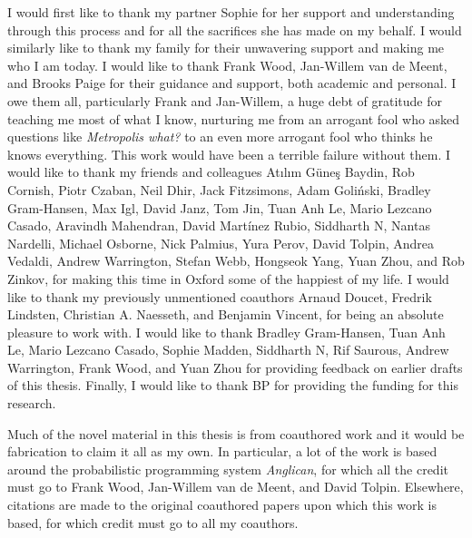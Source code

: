 
\vspace{20pt}
I would first like to thank my partner Sophie for her support and understanding through this
process and for all the sacrifices she has made on my behalf.  I would similarly like to
thank my family for their unwavering support and making me who I am today.  I would like
to thank Frank Wood, Jan-Willem van de Meent, and Brooks Paige for their guidance and
support, both academic and personal.  I owe them all, particularly Frank and Jan-Willem,
a huge debt of gratitude for teaching me most of what I know, nurturing me from an
arrogant fool who asked questions like \emph{Metropolis what?} to an even more arrogant
fool who thinks he knows everything.  This work would have been a terrible failure without them.
I would like to thank my friends and colleagues 
Atılım Güneş Baydin, Rob Cornish, Piotr Czaban, Neil Dhir, Jack Fitzsimons, Adam Goliński,
Bradley Gram-Hansen, Max Igl, David Janz, Tom Jin, Tuan Anh Le, Mario Lezcano Casado, 
Aravindh Mahendran, David Martínez Rubio, Siddharth N, Nantas Nardelli, Michael Osborne,
Nick Palmius, Yura Perov, David Tolpin, Andrea Vedaldi, Andrew Warrington, Stefan Webb, 
Hongseok Yang, Yuan Zhou, and Rob Zinkov, for making this time in Oxford some of the 
happiest of my life.  I would like to thank my previously unmentioned coauthors Arnaud Doucet, Fredrik Lindsten,
Christian A. Naesseth, and Benjamin Vincent, for being an absolute pleasure to work with.
I would like to thank Bradley Gram-Hansen, Tuan Anh Le, Mario Lezcano Casado, Sophie Madden, Siddharth N, Rif Saurous,
Andrew Warrington, Frank Wood, and Yuan Zhou for providing feedback on earlier drafts of this thesis.
Finally, I would like to thank BP for providing the funding for this research.

Much of the novel material in this thesis is from coauthored work and it would be fabrication
to claim it all as my own.  In particular, a lot of the work is based around the probabilistic 
programming system \emph{Anglican}, for which all the credit must go to Frank Wood,
Jan-Willem van de Meent, and David Tolpin. Elsewhere, citations are made
to the original coauthored papers upon which this work is based, for which credit
must go to all my coauthors.